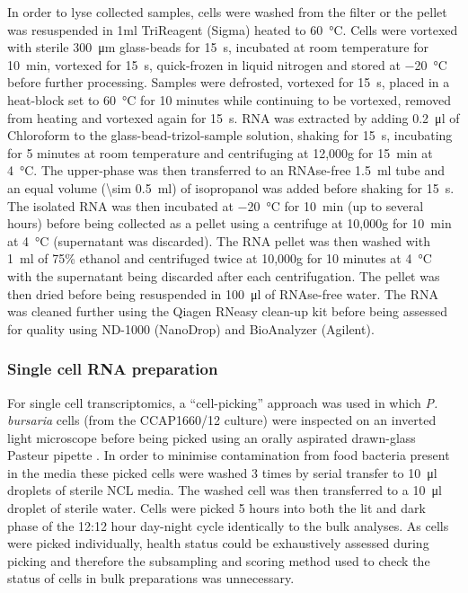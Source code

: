 In order to lyse collected samples, cells were washed from the filter or the 
pellet was resuspended in 1ml TriReagent (Sigma) heated to \SI{60}{\degreeCelsius}. 
Cells were vortexed with sterile \SI{300}{\micro\metre} glass-beads for \SI{15}{\second}, incubated at 
room temperature for \SI{10}{\minute}, vortexed for \SI{15}{\second}, quick-frozen in liquid 
nitrogen and stored at \SI{-20}{\degreeCelsius}
before further processing.  
Samples were defrosted, vortexed for \SI{15}{\second}, placed in a heat-block set 
to \SI{60}{\degreeCelsius}
for 10 minutes while continuing to be vortexed, removed from 
heating and vortexed again for \SI{15}{\second}.
RNA was extracted by adding \SI{0.2}{\micro\litre} of Chloroform to the glass-bead-trizol-sample 
solution, shaking for \SI{15}{\second}, incubating for 5 minutes at room temperature and 
centrifuging at 12,000g for \SI{15}{\minute} at \SI{4}{\degreeCelsius}.  
The upper-phase was then transferred to an RNAse-free \SI{1.5}{\milli\litre} tube and an 
equal volume (\SI{\sim 0.5}{\milli\litre}) of isopropanol was added before shaking for \SI{15}{\second}.  
The isolated RNA was then incubated at \SI{-20}{\degreeCelsius} for \SI{10}{\minute}
(up to several hours) before being collected as a pellet using a centrifuge at 
10,000g for \SI{10}{\minute} at \SI{4}{\degreeCelsius}
(supernatant was discarded). 
The RNA pellet was then washed with \SI{1}{\milli\litre} of 75\% ethanol and centrifuged 
twice at 10,000g for 10 minutes at \SI{4}{\degreeCelsius} with the supernatant being 
discarded after each centrifugation.  
The pellet was then dried before being resuspended in \SI{100}{\micro\litre} of RNAse-free water.  
The RNA was cleaned further using the Qiagen RNeasy clean-up kit 
before being assessed for quality using ND-1000 (NanoDrop) and BioAnalyzer (Agilent).

\subsubsection{Single cell RNA preparation}
For single cell transcriptomics, a ``cell-picking'' approach was used in which
\textit{P. bursaria} cells (from the CCAP1660/12 culture) were inspected on an inverted light microscope 
before being picked using an orally aspirated drawn-glass Pasteur pipette \citep{Garcia-Cuetos2012}.
In order to minimise contamination from food bacteria present in the media these picked cells
were washed 3 times by serial transfer to \SI{10}{\micro\litre} droplets of sterile NCL media.
The washed cell was then transferred to a \SI{10}{\micro\litre} droplet of sterile water.
Cells were picked 5 hours into both the lit and dark phase of the 12:12 hour day-night cycle 
identically to the bulk analyses.
As cells were picked individually, health status could be exhaustively assessed
during picking and therefore the subsampling and scoring method used to
check the status of cells in bulk preparations was unnecessary.

